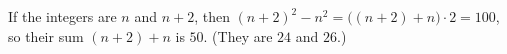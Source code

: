 If the integers are $n$ and $n+2$, then $(n+2)^2-n^2=\bigl((n+2)+n\bigr)\cdot2=100$, so their sum $(n+2)+n$ is $\boxed{50}$. (They are $24$ and $26$.)
